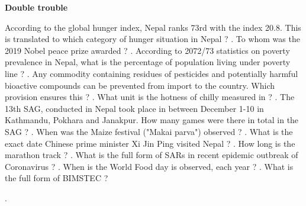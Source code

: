 \documentclass[10pt,a4paper,answers]{exam}
\begin{document}
\begin{center}
{\textbf {\LARGE Double trouble}}
\end{center}
\begin{questions}
  \question According to the global hunger index, Nepal ranks 73rd with the index 20.8. This is translated to which category of hunger situation in Nepal ? \fillin[Serious][3cm].
  \question To whom was the 2019 Nobel peace prize awarded ? .
  \question According to 2072/73 statistics on poverty prevalence in Nepal, what is the percentage of population living under poverty line ? \fillin[21.6\%][3cm]. 
  \question Any commodity containing residues of pesticides and potentially harmful bioactive compounds can be prevented from import to the country. Which provision ensures this ? .
  \question What unit is the hotness of chilly measured in ? .
  \question The 13th SAG, conducted in Nepal took place in between December 1-10 in Kathmandu, Pokhara and Janakpur. How many games were there in total in the SAG ? \fillin[26][3cm].
  \question When was the Maize festival ("Makai parva") observed ? \fillin[1977 BS][3cm].
  \question What is the exact date Chinese prime minister Xi Jin Ping visited Nepal ? .
  \question How long is the marathon track ? .
  \question What is the full form of SARs in recent epidemic outbreak of Coronavirus ? .
  \question When is the World Food day is observed, each year ? \fillin[16th October][3cm].
  \question What is the full form of BIMSTEC ? 
  
  .
  
\end{questions}
\end{document}
